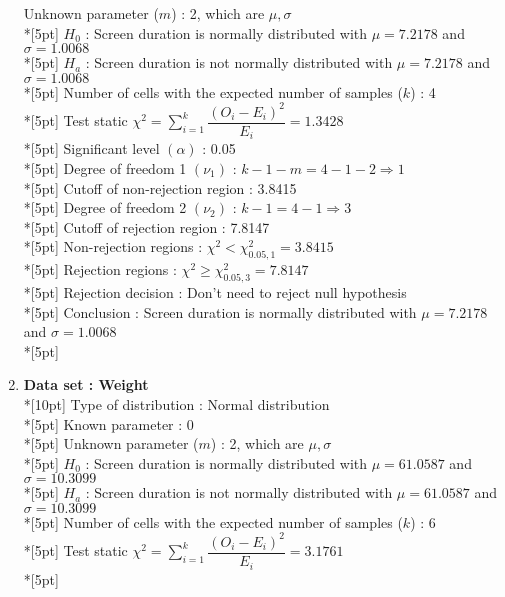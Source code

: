 \begin{enumerate}
        Unknown parameter ($m$) : 2, which are \(\mu, \sigma\)\\*[5pt]
        $H_0$ : Screen duration is normally distributed with $\mu=7.2178$ and $\sigma=1.0068$\\*[5pt]
        $H_a$ : Screen duration is not normally distributed with $\mu=7.2178$ and $\sigma=1.0068$\\*[5pt]
        Number of cells with the expected number of samples ($k$) : 4\\*[5pt]
        Test static \(\chi^2=\displaystyle\sum\limits^k_{i=1}\dfrac{\left(O_i-E_i\right)^2}{E_i}=1.3428\)\\*[5pt]
        Significant level \(\left(\alpha\right)\) : 0.05\\*[5pt]
        Degree of freedom 1 \((\nu_1)\) : $k - 1 - m = 4 - 1 - 2 \Rightarrow 1$\\*[5pt]
        Cutoff of non-rejection region : 3.8415\\*[5pt]
        Degree of freedom 2 \((\nu_2)\) : $k - 1 = 4 - 1 \Rightarrow 3$\\*[5pt]
        Cutoff of rejection region : 7.8147\\*[5pt]
        Non-rejection regions : \(\chi^2 < \chi^2_{0.05, 1}=3.8415\)\\*[5pt]
        Rejection regions : \(\chi^2 \geq \chi^2_{0.05, 3}=7.8147\)\\*[5pt]
        Rejection decision : Don't need to reject null hypothesis\\*[5pt]
        Conclusion : Screen duration is normally distributed with $\mu=7.2178$ and $\sigma=1.0068$\\*[5pt]
    \item \textbf{Data set : Weight}\\*[10pt]
        Type of distribution : Normal distribution\\*[5pt]
        Known parameter : 0\\*[5pt]
        Unknown parameter ($m$) : 2, which are \(\mu, \sigma\)\\*[5pt]
        $H_0$ : Screen duration is normally distributed with $\mu=61.0587$ and $\sigma=10.3099$\\*[5pt]
        $H_a$ : Screen duration is not normally distributed with $\mu=61.0587$ and $\sigma=10.3099$\\*[5pt]
        Number of cells with the expected number of samples ($k$) : 6\\*[5pt]
        Test static \(\chi^2=\displaystyle\sum\limits^k_{i=1}\dfrac{\left(O_i-E_i\right)^2}{E_i}=3.1761\)\\*[5pt]

\end{enumerate}
